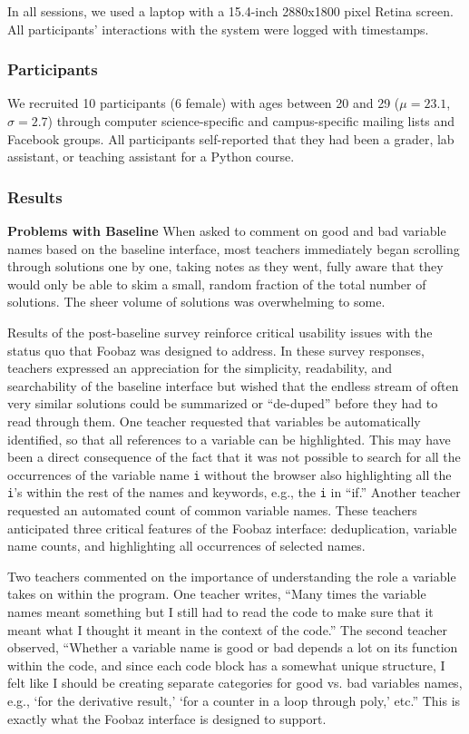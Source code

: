 In all sessions, we used a laptop with a 15.4-inch 2880x1800 pixel Retina screen. All participants' interactions with the system were logged with timestamps.

\subsubsection{Participants}

We recruited 10 participants (6 female) with ages between 20 and 29 ($\mu=23.1$, $\sigma=2.7$) through computer science-specific and campus-specific mailing lists and Facebook groups. All participants self-reported that they had been a grader, lab assistant, or teaching assistant for a Python course. 

\subsubsection{Results}

\textbf{Problems with Baseline} When asked to comment on good and bad variable names based on the baseline interface, most teachers immediately began scrolling through solutions one by one, taking notes as they went, fully aware that they would only be able to skim a small, random fraction of the total number of solutions. The sheer volume of solutions was overwhelming to some. 

Results of the post-baseline survey reinforce critical usability issues with the status quo that Foobaz was designed to address. In these survey responses, teachers expressed an appreciation for the simplicity, readability, and searchability of the baseline interface but wished that the endless stream of often very similar solutions could be summarized or ``de-duped'' before they had to read through them. One teacher requested that variables be automatically identified, so that all references to a variable can be highlighted. This may have been a direct consequence of the fact that it was not possible to search for all the occurrences of the variable name \texttt{i} without the browser also highlighting all the \texttt{i}'s within the rest of the names and keywords, e.g., the \texttt{i} in ``if.'' Another teacher requested an automated count of common variable names. These teachers anticipated three critical features of the Foobaz interface: deduplication, variable name counts, and highlighting all occurrences of selected names.

Two teachers commented on the importance of understanding the role a variable takes on within the program. One teacher writes, ``Many times the variable names meant something but I still had to read the code to make sure that it meant what I thought it meant in the context of the code.'' The second teacher observed, ``Whether a variable name is good or bad depends a lot on its function within the code, and since each code block has a somewhat unique structure, I felt like I should be creating separate categories for good vs. bad variables names, e.g., `for the derivative result,' `for a counter in a loop through poly,' etc.'' This is exactly what the Foobaz interface is designed to support. 

